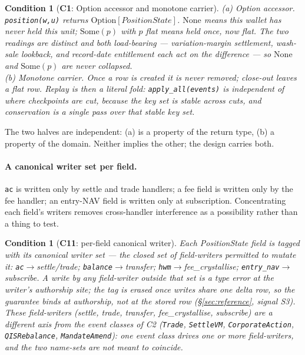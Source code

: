 \documentclass[11pt,a4paper]{article}
\newtheorem{condition}[definition]{Condition}
\begin{document}
\begin{condition}[\textbf{C1}: Option accessor and monotone carrier]
\emph{(a) Option accessor.} \texttt{position(w,u)} returns
$\mathrm{Option}[\mathit{PositionState}]$. $\mathrm{None}$ means \emph{this wallet has never
held this unit}; $\mathrm{Some}(p)$ with $p$ flat means \emph{held once, now flat}. The two
readings are distinct and both load-bearing --- variation-margin settlement, wash-sale
lookback, and record-date entitlement each act on the difference --- so $\mathrm{None}$ and
$\mathrm{Some}(p)$ are never collapsed.\\
\emph{(b) Monotone carrier.} Once a row is created it is never removed; close-out leaves a
flat row. Replay is then a literal fold: \texttt{apply\_all(events)} is independent of where
checkpoints are cut, because the key set is stable across cuts, and conservation is a single
pass over that stable key set.
\end{condition}

\noindent The two halves are independent: (a) is a property of the return type, (b) a
property of the domain. Neither implies the other; the design carries both.

\paragraph{A canonical writer set per field.}
\texttt{ac} is written only by settle and trade handlers; a fee field is written only by the
fee handler; an entry-NAV field is written only at subscription. Concentrating each field's
writers removes cross-handler interference as a possibility rather than a thing to test.

\begin{condition}[\textbf{C11}: per-field canonical writer]
Each \emph{PositionState} field is tagged with its canonical writer set --- the closed set
of field-writers permitted to mutate it: \texttt{ac}$\to$settle/trade;
\texttt{balance}$\to$transfer; \texttt{hwm}$\to$fee\_crystallise;
\texttt{entry\_nav}$\to$subscribe. A write by any field-writer outside that set is a type
error at the writer's authorship site; the tag is erased once writes
share one delta row, so the guarantee binds at authorship, not at the stored row
(\S\ref{sec:reference}, signal S3). These field-writers (settle, trade, transfer,
fee\_crystallise, subscribe) are a different axis from the event classes of C2
(\texttt{Trade}, \texttt{SettleVM}, \texttt{CorporateAction}, \texttt{QISRebalance},
\texttt{MandateAmend}): one event class drives one or more field-writers, and the two
name-sets are not meant to coincide.
\end{condition}
\end{document}
